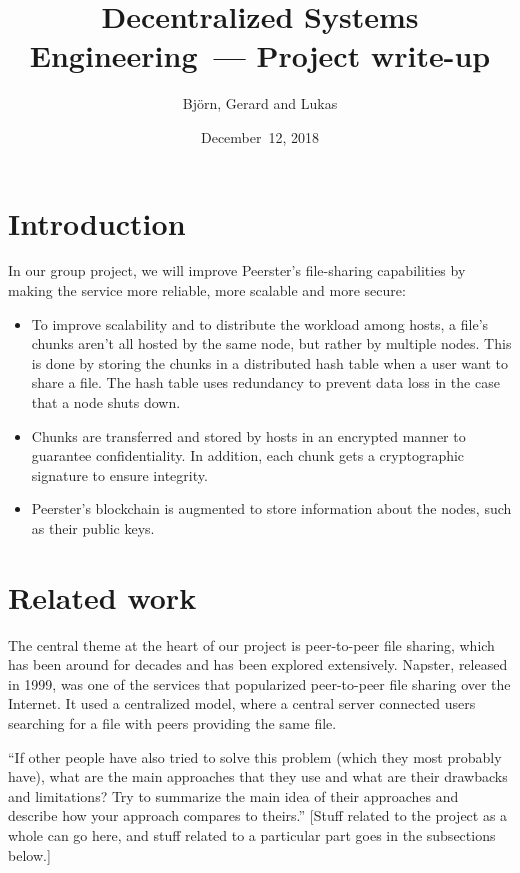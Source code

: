 \documentclass[12pt,a4paper,draft]{article}
\title{Decentralized Systems Engineering~--- Project write-up}
\author{Björn, Gerard and Lukas}
\date{December~12, 2018}
\begin{document}
\maketitle
\tableofcontents

\section{Introduction}

In our group project, we will improve Peerster's file-sharing capabilities by making the service more reliable, more scalable and more secure:

\begin{itemize}
    \item To improve scalability and to distribute the workload among hosts, a file's chunks aren't all hosted by the same node, but rather by multiple nodes.
    This is done by storing the chunks in a distributed hash table when a user want to share a file.
    The hash table uses redundancy to prevent data loss in the case that a node shuts down.
    \item Chunks are transferred and stored by hosts in an encrypted manner to guarantee confidentiality.
    In addition, each chunk gets a cryptographic signature to ensure integrity.
    \item Peerster's blockchain is augmented to store information about the nodes, such as their public keys.
\end{itemize}

\section{Related work}

The central theme at the heart of our project is peer-to-peer file sharing, which has been around for decades and has been explored extensively.
Napster, released in 1999, was one of the services that popularized peer-to-peer file sharing over the Internet.
It used a centralized model, where a central server connected users searching for a file with peers providing the same file.

``If other people have also tried to solve this problem (which they most probably have), what
are the main approaches that they use and what are their drawbacks and limitations?
Try to summarize the main idea of their approaches and describe how your approach compares to
theirs.''
[Stuff related to the project as a whole can go here, and stuff related to a particular part goes in the subsections below.]
\end{document}

